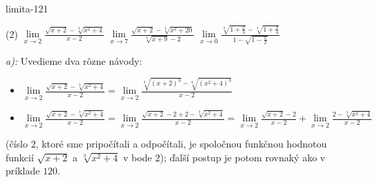 \begin{defproblem}{limita-121}
\begin{tasks}(2)
\task $\lim\limits_{x \rightarrow 2} \frac{\sqrt{x+2}-\sqrt[3]{x^2+4}}{x-2}$
\task $\lim\limits_{x \rightarrow 7} \frac{\sqrt{x+2}-\sqrt[3]{x^2+20}}{\sqrt[4]{x+9}-2}$
\task $\lim\limits_{x \rightarrow 0} \frac{\sqrt[3]{1+\frac{x}{3}}-\sqrt[4]{1+\frac{x}{4}}}{1-\sqrt{1-\frac{x}{2}}}$
\end{tasks}

\begin{solution}
    \textit{a):}
    Uvedieme dva rôzne návody:
    \begin{itemize}
    \item $
        \lim\limits_{x \rightarrow 2} \frac{\sqrt{x+2}-\sqrt[3]{x^2+4}}{x-2}
        =\lim\limits_{x \rightarrow 2} \frac{\sqrt[6]{(x+2)^3}
            - \sqrt[6]{(x^2+4)^3}}{x-2}
    $
    \item $
        \lim\limits_{x \rightarrow 2} \frac{\sqrt{x+2}-\sqrt[3]{x^2+4}}{x-2}
        = \lim\limits_{x \rightarrow 2} \frac{\sqrt{x+2}-2+2-\sqrt[3]{x^2+4}}{x-2}
        = \lim\limits_{x \rightarrow 2} \frac{\sqrt{x+2}-2}{x-2}
            +\lim\limits_{x \rightarrow 2} \frac{2-\sqrt[3]{x^2+4}}{x-2}
    $
    \end{itemize}

    (číslo $2$, ktoré sme pripočítali a odpočítali, je spoločnou funkčnou
    hodnotou funkcií $\sqrt{x+2}$ a $\sqrt[3]{x^2+4}$ v bode $2$); ďalší postup
    je potom rovnaký ako v príklade $120$.
\end{solution}
\end{defproblem}

